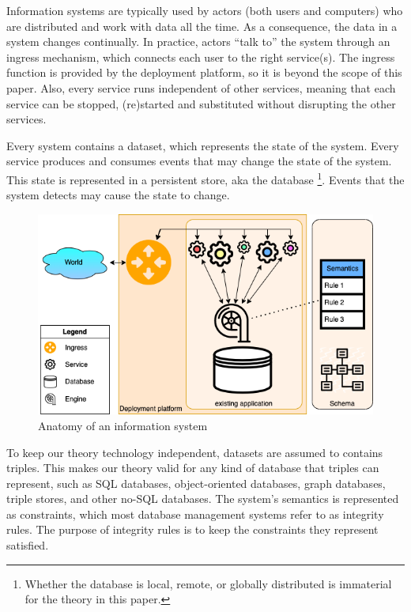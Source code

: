\documentclass{elsarticle}
\begin{document}
   Information systems are typically used by actors (both users and computers) who are distributed and work with data all the time.
   As a consequence, the data in a system changes continually.
   In practice, actors ``talk to'' the system through an ingress mechanism, which connects each user to the right service(s).
   The ingress function is provided by the deployment platform, so it is beyond the scope of this paper.
   Also, every service runs independent of other services,
   meaning that each service can be stopped, (re)started and substituted without disrupting the other services.

   Every system contains a dataset, which represents the state of the system.
   Every service produces and consumes events that may change the state of the system.
   This state is represented in a persistent store, aka the database%
\footnote{Whether the database is local, remote, or globally distributed is immaterial for the theory in this paper.}.
   Events that the system detects may cause the state to change.
\begin{figure}[bht]
   \begin{center}
     \includegraphics[scale=.45]{datamigration-Pre-migration.drawio.png}
   \end{center}
\caption{Anatomy of an information system}
\label{fig:pre-migration}
\end{figure}
   To keep our theory technology independent, datasets are assumed to contains triples.
   This makes our theory valid for any kind of database that triples can represent,
   such as SQL databases, object-oriented databases, graph databases, triple stores, and other no-SQL databases.
   The system's semantics is represented as constraints,
   which most database management systems refer to as integrity rules.
   The purpose of integrity rules is to keep the constraints they represent satisfied.
\end{document}
